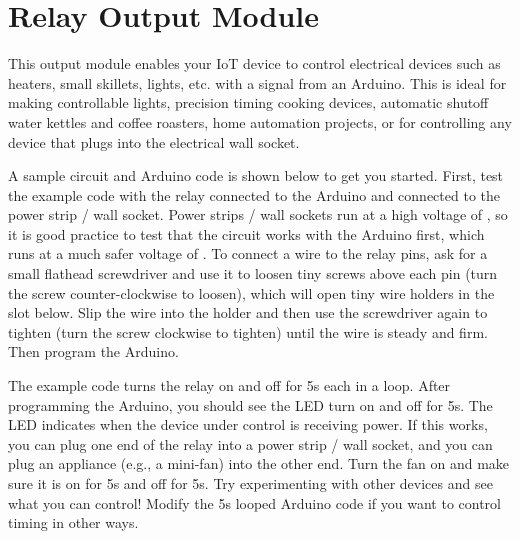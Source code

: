 
\clearpage
\section{Relay Output Module}
\label{sec-output-relay}

This output module enables your IoT device to control electrical devices
such as heaters, small skillets, lights, etc. with a signal from an
Arduino. This is ideal for making controllable lights, precision timing
cooking devices, automatic shutoff water kettles and coffee roasters,
home automation projects, or for controlling any device that plugs into
the electrical wall socket.

A sample circuit and Arduino code is shown below to get you started.
First, test the example code with the relay connected to the Arduino and
 connected to the power strip / wall socket. Power strips / wall
sockets run at a high voltage of , so it is good practice to
test that the circuit works with the Arduino first, which runs at a much
safer voltage of . To connect a wire to the relay pins,
ask for a small flathead screwdriver and use it to loosen tiny screws
above each pin (turn the screw counter-clockwise to loosen), which will
open tiny wire holders in the slot below. Slip the wire into the holder
and then use the screwdriver again to tighten (turn the screw clockwise
to tighten) until the wire is steady and firm. Then program the Arduino.

The example code turns the relay on and off for {5}{s} each in a loop.
After programming the Arduino, you should see the LED turn on and off
for {5}{s}. The LED indicates when the device under control is receiving
power. If this works, you can plug one end of the relay into a power
strip / wall socket, and you can plug an appliance (e.g., a mini-fan)
into the other end. Turn the fan on and make sure it is on for {5}{s}
and off for {5}{s}. Try experimenting with other devices and see what
you can control! Modify the {5}{s} looped Arduino code if you want to
control timing in other ways.

